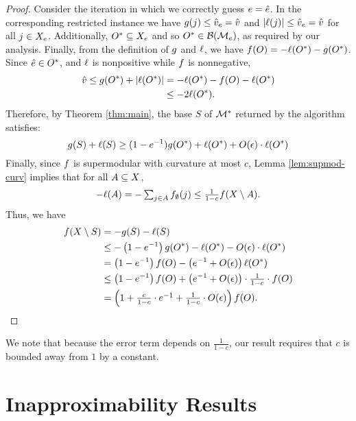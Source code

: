 \documentclass{article}
\theoremstyle{definition}
\begin{document}
\begin{proof}
Consider the iteration in which we correctly guess $e = \hat{e}$.  In the corresponding restricted instance we have $g(j) \le \hat{v}_{e} = \hat{v}$ and $|\ell(j)| \le \hat{v}_{e} = \hat{v}$ for all $j \in X_{e}$.  Additionally, $O^{*} \subseteq X_{e}$ and so $O^{*} \in \mathcal{B}(\mathcal{M}_{e})$, as required by our analysis.   Finally, from the definition of $g$ and $\ell$, we have $f(O) = -\ell(O^{*}) - g(O^{*})$.  Since $\hat{e} \in O^{*}$, and $\ell$ is nonpositive while $f$ is nonnegative, 
\begin{align*}
\hat{v} \le g(O^{*}) + |\ell(O^{*})| &= -\ell(O^{*}) - f(O) - \ell(O^{*}) \\
&\le -2\ell(O^{*}).
\end{align*}
Therefore, by Theorem \ref{thm:main}, the base $S$ of $\mathcal{M}^{*}$ returned by the algorithm satisfies:
\begin{equation*}
\label{eq:supmod1}
g(S) + \ell(S) \ge (1 - e^{-1})g(O^{*}) + \ell(O^{*}) + O(\epsilon) \cdot \ell(O^{*})
\end{equation*}
Finally, since $f$ is supermodular with curvature at most $c$, Lemma \ref{lem:supmod-curv} implies that for all $A \subseteq X$,
$$\textstyle -\ell(A) = -\sum_{j \in A}f_{\emptyset}(j) \le \frac{1}{1-c}f(X \setminus A).$$
Thus, we have
\begin{align*}
f(X \setminus S) 
&= -g(S) - \ell(S) \\
&\le -\left(1-e^{-1}\right)g(O^{*}) - \ell(O^{*}) - O(\epsilon) \cdot \ell(O^{*}) \\
&= \left(1-e^{-1}\right)f(O) - \left(e^{-1} + O(\epsilon)\right)\ell(O^{*}) \\
&\le \left(1 - e^{-1}\right)f(O) + \left(e^{-1} + O(\epsilon)\right)\cdot\textstyle \frac{1}{1-c}\cdot f(O) \\
&= \left(1 + \textstyle\frac{c}{1-c}\cdot e^{-1} + \frac{1}{1-c}\cdot O(\epsilon)\right)f(O).
\end{align*}
\end{proof}
We note that because the error term depends on $\frac{1}{1-c}$, our result requires that $c$ is bounded away from $1$ by a constant.


\section{Inapproximability Results}
\label{sec:inappr-results}
\end{document}
